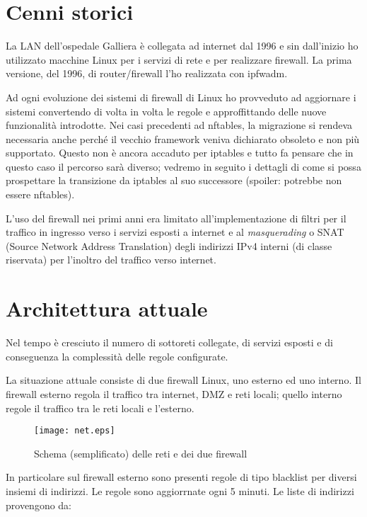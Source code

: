 \section{Cenni storici}

La LAN dell'ospedale Galliera è collegata ad internet dal 1996 e sin
dall'inizio ho utilizzato macchine Linux per i servizi di rete e per
realizzare firewall.  La prima versione, del 1996, di router/firewall l'ho
realizzata con ipfwadm.

Ad ogni evoluzione dei sistemi di firewall di Linux ho provveduto ad
aggiornare i sistemi convertendo di volta in volta le regole e approffittando
delle nuove funzionalità introdotte.  Nei casi precedenti ad nftables, la
migrazione si rendeva necessaria anche perché il vecchio framework veniva
dichiarato obsoleto e non più supportato.  Questo non è ancora accaduto per
iptables e tutto fa pensare che in questo caso il percorso sarà diverso;
vedremo in seguito i dettagli di come si possa prospettare la transizione da
iptables al suo successore (spoiler: potrebbe non essere nftables).

L'uso del firewall nei primi anni era limitato all'implementazione di filtri
per il traffico in ingresso verso i servizi esposti a internet e al {\em
masquerading} o SNAT (Source Network Address Translation) degli indirizzi IPv4
interni (di classe riservata) per l'inoltro del traffico verso internet.

\section{Architettura attuale}
Nel tempo è cresciuto il numero di sottoreti collegate, di servizi esposti e
di conseguenza la complessità delle regole configurate.

La situazione attuale consiste di due firewall Linux, uno esterno ed uno
interno.  Il firewall esterno regola il traffico tra internet, DMZ e reti
locali; quello interno regole il traffico tra le reti locali e l'esterno.

\begin{figure}
\begin{center}
    \texttt{[image: net.eps]}
    \caption{Schema (semplificato) delle reti e dei due firewall}
    \label{fig:rete}
\end{center}
\end{figure}
In particolare sul firewall esterno sono presenti regole di tipo blacklist per
diversi insiemi di indirizzi. Le regole sono aggiorrnate
ogni 5 minuti.  Le liste di indirizzi provengono da:

